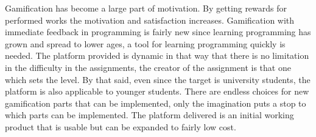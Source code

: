 Gamification has become a large part of motivation. By getting rewards for performed works the motivation and satisfaction increases. Gamification with immediate feedback in programming is fairly new since learning programming has grown and spread to lower ages, a tool for learning programming quickly is needed.  
The platform provided is dynamic in that way that there is no limitation in the difficulty in the assignments, the creator of the assignment is that one which sets the level. By that said, even since the target is university students, the platform is also applicable to younger students. There are endless choices for new gamification parts that can be implemented, only the imagination puts a stop to which parts can be implemented. The platform delivered is an initial working product that is usable but can be expanded to fairly low cost. 
